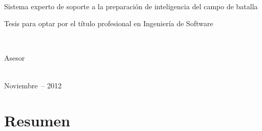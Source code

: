 \documentclass[12pt,a4paper,footinclude=true,headinclude=true,spanish]{scrbook}
\newcommand*{\ruta}{/gcca/hogar/Dropbox/gcca/gueco/doc/expo/tesis}%
\begin{document}
\frenchspacing
\raggedbottom



\begin{titlepage}
  \begin{addmargin}[-1cm]{-3cm}
    \begin{center}
        \large

        \hfill

        \vfill

        \begingroup
            \color{Maroon} \\ \bigskip
        \endgroup
        Sistema experto de soporte a la preparación de inteligencia del campo de batalla

        \vfill

        Tesis para optar por el título profesional en Ingeniería de Software

        \vfill

        \\

        \vfill


        Asesor \\
         \\
        \medskip

        \vfill

        \vfill

        Noviembre\ -- 2012

        \vfill

    \end{center}
  \end{addmargin}
\end{titlepage}


\chapter*{Resumen}
\end{document}
